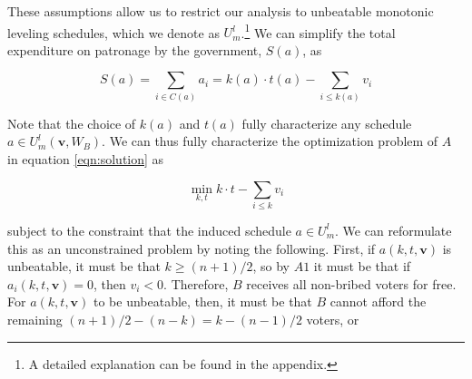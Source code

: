 
These assumptions allow us to restrict our analysis to unbeatable monotonic leveling schedules, which we denote as $U_m^l$.\footnote{A detailed explanation can be found in the appendix.} We can simplify the total expenditure on patronage by the government, $S(a)$, as

\begin{equation*}
    S(a) = \sum_{i \in C(a)}a_i = k(a) \cdot t(a) - \sum_{i \leq k(a)}v_i
\end{equation*}

Note that the choice of $k(a)$ and $t(a)$ fully characterize any schedule $a \in U_m^l(\mathbf{v}, W_B)$. We can thus fully characterize the optimization problem of $A$ in equation \ref{eqn:solution} as

\begin{equation*}
    \min_{k,t} k \cdot t- \sum_{i \leq k} v_i
\end{equation*}

subject to the constraint that the induced schedule $a \in U_m^l$. We can reformulate this as an unconstrained problem by noting the following. First, if $a(k, t, \mathbf{v})$ is unbeatable, it must be that $k \geq (n + 1)/2$, so by $A1$ it must be that if $a_i(k, t, \mathbf{v}) = 0$, then $v_i < 0$. Therefore, $B$ receives all non-bribed voters for free. For $a(k, t, \mathbf{v})$ to be unbeatable, then, it must be that $B$ cannot afford the remaining $(n + 1)/2 - (n - k) = k - (n - 1)/2$ voters, or

